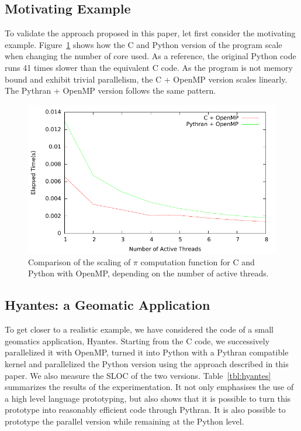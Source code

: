 \documentclass[conference]{IEEEtran}
\begin{document}
\subsection{Motivating Example}

To validate the approach proposed in this paper, let first consider the
motivating example. Figure~\ref{fig:motivating-example-scale} shows how the C
and Python version of the program scale when changing the number of core used.
As a reference, the original Python code runs 41 times slower than the
equivalent C code. As the program is not memory bound and exhibit trivial
parallelism, the C + OpenMP version scales linearly. The Pythran + OpenMP
version follows the same pattern.

\begin{figure}

    \caption{Comparison of the scaling of $\pi$ computation function for C and
    Python with OpenMP, depending on the number of active threads.}
    \label{fig:motivating-example-scale}

    \includegraphics[width=.5\textwidth]{pi_omp_bench.pdf}

\end{figure}


\subsection{Hyantes: a Geomatic Application}

To get closer to a realistic example, we have considered the code of a small
geomatics application, Hyantes. Starting from the C code, we successively
parallelized it with OpenMP, turned it into Python with a Pythran compatible
kernel and parallelized the Python version using the approach described in this
paper. We also measure the SLOC of the two versions.  Table~\ref{tbl:hyantes}
summarizes the results of the experimentation. It not only emphasises the
use of a high level language prototyping, but also shows that it is possible to
turn this prototype into reasonably efficient code through Pythran. It is also
possible to prototype the parallel version while remaining at the Python level.
\end{document}
